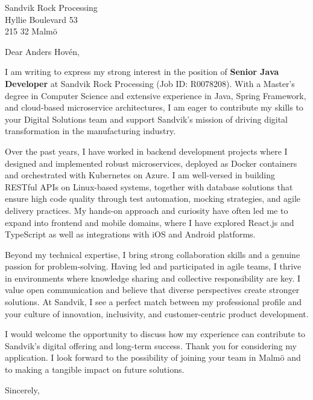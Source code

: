 \documentclass[11pt,a4paper]{letter}
\date{\today}
\begin{document}
\begin{letter}{Sandvik Rock Processing \\
Hyllie Boulevard 53 \\
215 32 Malmö}

\opening{Dear Anders Hovén,}

I am writing to express my strong interest in the position of \textbf{Senior Java Developer} at Sandvik Rock Processing (Job ID: R0078208). With a Master’s degree in Computer Science and extensive experience in Java, Spring Framework, and cloud-based microservice architectures, I am eager to contribute my skills to your Digital Solutions team and support Sandvik’s mission of driving digital transformation in the manufacturing industry. 

Over the past years, I have worked in backend development projects where I designed and implemented robust microservices, deployed as Docker containers and orchestrated with Kubernetes on Azure. I am well-versed in building RESTful APIs on Linux-based systems, together with database solutions that ensure high code quality through test automation, mocking strategies, and agile delivery practices. My hands-on approach and curiosity have often led me to expand into frontend and mobile domains, where I have explored React.js and TypeScript as well as integrations with iOS and Android platforms.  

Beyond my technical expertise, I bring strong collaboration skills and a genuine passion for problem-solving. Having led and participated in agile teams, I thrive in environments where knowledge sharing and collective responsibility are key. I value open communication and believe that diverse perspectives create stronger solutions. At Sandvik, I see a perfect match between my professional profile and your culture of innovation, inclusivity, and customer-centric product development.  

I would welcome the opportunity to discuss how my experience can contribute to Sandvik’s digital offering and long-term success. Thank you for considering my application. I look forward to the possibility of joining your team in Malmö and to making a tangible impact on future solutions.  

\closing{Sincerely,}

\end{letter}
\end{document}
